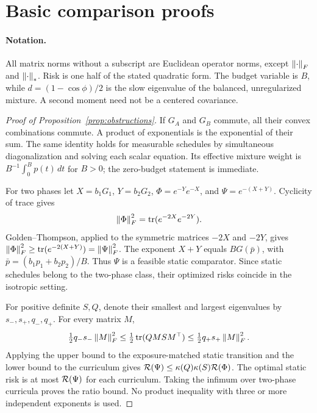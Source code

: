 \section{Basic comparison proofs}\label{app:basic}
\paragraph{Notation.} All matrix norms without a subscript are Euclidean operator norms, except $\left\lVert\cdot\right\rVert_F$ and $\left\lVert\cdot\right\rVert_*$. Risk is one half of the stated quadratic form. The budget variable is $B$, while $d=(1-\cos\phi)/2$ is the slow eigenvalue of the balanced, unregularized mixture. A second moment need not be a centered covariance.

\begin{proof}[Proof of Proposition~\ref{prop:obstructions}]
If $G_A$ and $G_B$ commute, all their convex combinations commute. A product of exponentials is the exponential of their sum. The same identity holds for measurable schedules by simultaneous diagonalization and solving each scalar equation. Its effective mixture weight is $B^{-1}\int_0^B p(t)\,dt$ for $B>0$; the zero-budget statement is immediate.

For two phases let $X=b_1G_1$, $Y=b_2G_2$, $\Phi=e^{-Y}e^{-X}$, and $\Psi=e^{-(X+Y)}$. Cyclicity of trace gives
\[
 \left\lVert\Phi\right\rVert_F^2=\operatorname{tr}(e^{-2X}e^{-2Y}).
\]
Golden--Thompson, applied to the symmetric matrices $-2X$ and $-2Y$, gives $\left\lVert\Phi\right\rVert_F^2\ge\operatorname{tr}(e^{-2(X+Y)})=\left\lVert\Psi\right\rVert_F^2$. The exponent $X+Y$ equals $BG(\bar p)$, with $\bar p=(b_1p_1+b_2p_2)/B$. Thus $\Psi$ is a feasible static comparator. Since static schedules belong to the two-phase class, their optimized risks coincide in the isotropic setting.

For positive definite $S,Q$, denote their smallest and largest eigenvalues by $s_-,s_+,q_-,q_+$. For every matrix $M$,
\[
 \tfrac12q_-s_-\left\lVert M\right\rVert_F^2\le\tfrac12\operatorname{tr}(QMSM^\top)
 \le\tfrac12q_+s_+\left\lVert M\right\rVert_F^2.
\]
Applying the upper bound to the exposure-matched static transition and the lower bound to the curriculum gives
$\mathcal R(\Psi)\le\kappa(Q)\kappa(S)\mathcal R(\Phi)$.
The optimal static risk is at most $\mathcal R(\Psi)$ for each curriculum. Taking the infimum over two-phase curricula proves the ratio bound. No product inequality with three or more independent exponents is used.
\end{proof}

